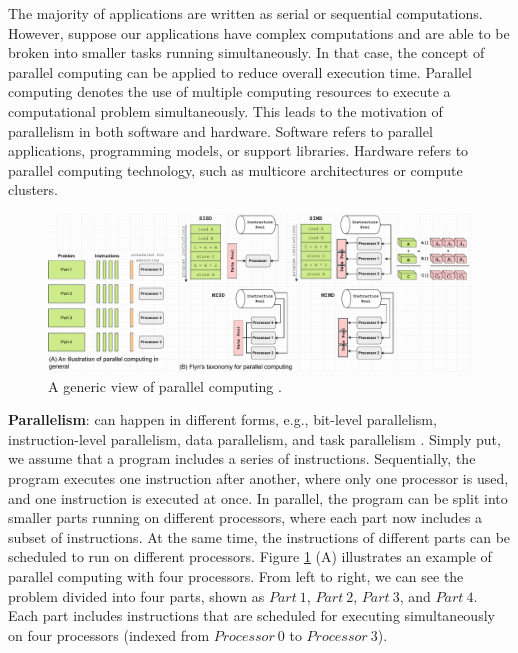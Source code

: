 
The majority of applications are written as serial or sequential computations. However, suppose our applications have complex computations and are able to be broken into smaller tasks running simultaneously. In that case, the concept of parallel computing can be applied to reduce overall execution time. Parallel computing denotes the use of multiple computing resources to execute a computational problem simultaneously. This leads to the motivation of parallelism in both software and hardware. Software refers to parallel applications, programming models, or support libraries. Hardware refers to parallel computing technology, such as multicore architectures or compute clusters.\\

\begin{figure}[t]
  \centering
  \includegraphics[scale=0.425]{./pictures/preliminaries/preli_parallel_computing_and_taxonomy.pdf}
	\caption{A generic view of parallel computing \cite{hpcllnl2023parcomp}.}
	\label{fig:preli_parallel_computing_and_taxonomy}
\end{figure}

\noindent \textbf{Parallelism}: can happen in different forms, e.g., bit-level parallelism, instruction-level parallelism, data parallelism, and task parallelism \cite{kumar1994intro} \cite{hpcllnl2023parcomp}. Simply put, we assume that a program includes a series of instructions. Sequentially, the program executes one instruction after another, where only one processor is used, and one instruction is executed at once. In parallel, the program can be split into smaller parts running on different processors, where each part now includes a subset of instructions. At the same time, the instructions of different parts can be scheduled to run on different processors. Figure \ref{fig:preli_parallel_computing_and_taxonomy} (A) illustrates an example of parallel computing with four processors. From left to right, we can see the problem divided into four parts, shown as $Part\ 1$, $Part\ 2$, $Part\ 3$, and $Part\ 4$. Each part includes instructions that are scheduled for executing simultaneously on four processors (indexed from $Processor\ 0$ to $Processor\ 3$).\\

